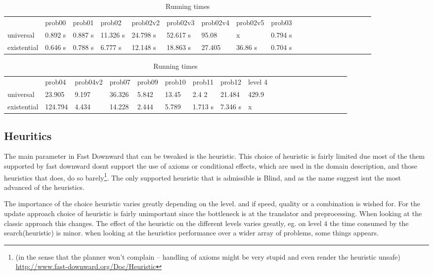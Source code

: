			\begin{table}[h]
				\centering
				\caption{Running times}
				\label{times}
				\begin{tabular}{llllllllllllllllllll}
					& prob00 & prob01& prob02& prob02v2& prob02v3& prob02v4& prob02v5& prob03\\
					universal 	& 0.892 s  &0.887 s &11.326 s &24.798 s  &52.617 s  &95.08    & x       &0.794 s  \\
					existential &0.646 s  &0.788 s  &6.777 s &12.148 s  &18.863 s  &27.405   &36.86 s  &0.704 s  \\
				\end{tabular}
				\begin{tabular}{llllllllllllllllllll}
					&  prob04& prob04v2& prob07&  prob09& prob10& prob11& prob12 & level 4\\
					universal    &23.905  &9.197      &36.326   &5.842  &13.45  &2.4 2           &21.484 &429.9\\
					existential      &124.794 &4.434   &14.228 &2.444  &5.789  &1.713 s        &7.346 s & x\\
				\end{tabular}
			\end{table}


\subsection{Heuritics}
The main parameter in Fast Downward that can be tweaked is the heuristic. This choice of heuristic is fairly limited due most of the them supported by fast downward dosnt support the use of axioms or conditional effects, which are used in the domain description, and those heuristics that does, do so barely\footnote{(in the sense that the planner won't complain -- handling of axioms might be very stupid and even render the heuristic unsafe) \url{http://www.fast-downward.org/Doc/Heuristic}}. The only supported heuristic that is admissible is Blind, and as the name suggest isnt the most advanced of the heuristics.

The importance of the choice heuristic varies greatly depending on the level. and if speed, quality or a combination is wished for. For the update approach choice of heuristic is fairly unimportant since the bottleneck is at the translator and preprocessing. When looking at the classic approach this changes. The effect of the heuristic on the different levels varies greatly, eg. on level 4 the time consumed by the search(heuristic) is minor. when looking at the heuristics performance over a wider array of problems, some things appears.

